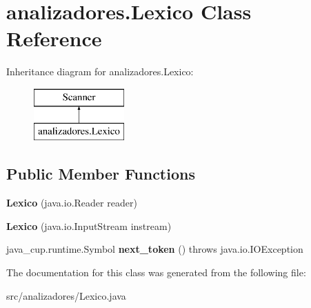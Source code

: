 \hypertarget{classanalizadores_1_1_lexico}{}\section{analizadores.\+Lexico Class Reference}
\label{classanalizadores_1_1_lexico}
Inheritance diagram for analizadores.\+Lexico\+:\begin{figure}[H]
\begin{center}
\leavevmode
\includegraphics[height=2.000000cm]{classanalizadores_1_1_lexico}
\end{center}
\end{figure}
\subsection*{Public Member Functions}
\begin{DoxyCompactItemize}
\item 
\mbox{\label{classanalizadores_1_1_lexico_ad64fd671966c3991545ef5a6a212cb9d}} 
{\bfseries Lexico} (java.\+io.\+Reader reader)
\item 
\mbox{\label{classanalizadores_1_1_lexico_a45236ae2e7893b61f7de9df2f3dde79d}} 
{\bfseries Lexico} (java.\+io.\+Input\+Stream instream)
\item 
\mbox{\label{classanalizadores_1_1_lexico_a024e816fa3941af9cb6e890bb1fb6e3c}} 
java\+\_\+cup.\+runtime.\+Symbol {\bfseries next\+\_\+token} ()  throws java.\+io.\+I\+O\+Exception 
\end{DoxyCompactItemize}


The documentation for this class was generated from the following file\+:\begin{DoxyCompactItemize}
\item 
src/analizadores/Lexico.\+java\end{DoxyCompactItemize}
